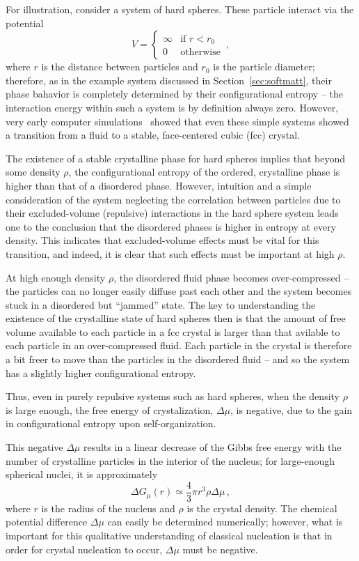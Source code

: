 For illustration, consider a system of hard spheres.
These particle interact via the potential
\begin{equation}V = \begin{cases} \infty & \textrm{if } r < r_0 \\ 0 & \textrm{otherwise}\end{cases}\,,\end{equation}
where $r$ is the distance between particles and $r_0$ is the particle diameter; therefore, as in the example system discussed in Section~\ref{sec:softmatt}, their phase bahavior is completely determined by their configurational entropy -- the interaction energy within such a system is by definition always zero.
However, very early computer simulations~\cite{Wood,Alder} showed that even these simple systems showed a transition from a fluid to a stable, face-centered cubic (fcc) crystal.

The existence of a stable crystalline phase for hard spheres implies that beyond some density $\rho$, the configurational entropy of the ordered, crystalline phase is higher than that of a disordered phase.
However, intuition and a simple consideration of the system neglecting the correlation between particles due to their excluded-volume (repulsive) interactions in the hard sphere system leads one to the conclusion that the disordered phases is higher in entropy at every density.
This indicates that excluded-volume effects must be vital for this transition, and indeed, it is clear that such effects must be important at high $\rho$.

At high enough density $\rho$, the disordered fluid phase becomes over-compressed -- the particles can no longer easily diffuse past each other and the system becomes stuck in a disordered but ``jammed'' state.
The key to understanding the existence of the crystalline state of hard spheres then is that the amount of free volume available to each particle in a fcc crystal is larger than that avilable to each particle in an over-compressed fluid.
Each particle in the crystal is therefore a bit freer to move than the particles in the disordered fluid -- and so the system has a slightly higher configurational entropy.

Thus, even in purely repulsive systems such as hard spheres, when the density $\rho$ is large enough, the free energy of crystalization, $\Delta \mu$, is negative, due to the gain in configurational entropy upon self-organization.

This negative $\Delta \mu$ results in a linear decrease of the Gibbs free energy with the number of crystalline particles in the interior of the nucleus; for large-enough spherical nuclei, it is approximately
\begin{equation}\Delta G_{\mu} (r) \simeq \frac{4}{3} \pi r^3 \rho \Delta \mu \,,\end{equation}
where $r$ is the radius of the nucleus and $\rho$ is the crystal density.
The chemical potential difference $\Delta\mu$ can easily be determined numerically; however, what is important for this qualitative understanding of classical nucleation is that in order for crystal nucleation to occur, $\Delta \mu$ must be negative.

